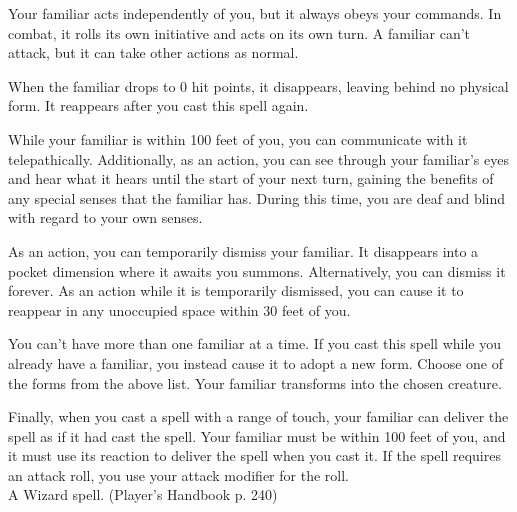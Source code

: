 \documentclass[10pt,twocolumn]{report}
\begin{document}
Your familiar acts independently of you, but it always obeys your commands. In combat, it rolls its own initiative and acts on its own turn. A familiar can’t attack, but it can take other actions as normal. 

When the familiar drops to 0 hit points, it disappears, leaving behind no physical form. It reappears after you cast this spell again. 

While your familiar is within 100 feet of you, you can communicate with it telepathically. Additionally, as an action, you can see through your familiar’s eyes and hear what it hears until the start of your next turn, gaining the benefits of any special senses that the familiar has. During this time, you are deaf and blind with regard to your own senses. 

As an action, you can temporarily dismiss your familiar. It disappears into a pocket dimension where it awaits you summons. Alternatively, you can dismiss it forever. As an action while it is temporarily dismissed, you can cause it to reappear in any unoccupied space within 30 feet of you. 

You can’t have more than one familiar at a time. If you cast this spell while you already have a familiar, you instead cause it to adopt a new form. Choose one of the forms from the above list. Your familiar transforms into the chosen creature. 

Finally, when you cast a spell with a range of touch, your familiar can deliver the spell as if it had cast the spell. Your familiar must be within 100 feet of you, and it must use its reaction to deliver the spell when you cast it. If the spell requires an attack roll, you use your attack modifier for the roll.\\
A Wizard spell. (Player's Handbook p. 240) \\
\end{document}
